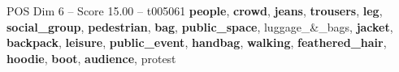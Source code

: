 \begin{textsample}{POS Dim 6 – Score 15.00 – t005061}  \label{ex:f6_pos_024}
\textbf{people}, \textbf{crowd}, \textbf{jeans}, \textbf{trousers}, \textbf{leg}, \textbf{social\_group}, \textbf{pedestrian}, \textbf{bag}, \textbf{public\_space}, luggage\_\&\_bags, \textbf{jacket}, \textbf{backpack}, \textbf{leisure}, \textbf{public\_event}, \textbf{handbag}, \textbf{walking}, \textbf{feathered\_hair}, \textbf{hoodie}, \textbf{boot}, \textbf{audience}, protest

\end{textsample}
